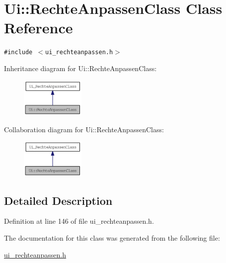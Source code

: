 \hypertarget{class_ui_1_1_rechte_anpassen_class}{
\section{Ui::RechteAnpassenClass Class Reference}
\label{class_ui_1_1_rechte_anpassen_class}
}
{\tt \#include $<$ui\_\-rechteanpassen.h$>$}

Inheritance diagram for Ui::RechteAnpassenClass:\nopagebreak
\begin{figure}[H]
\begin{center}
\leavevmode
\includegraphics[width=87pt]{class_ui_1_1_rechte_anpassen_class__inherit__graph}
\end{center}
\end{figure}
Collaboration diagram for Ui::RechteAnpassenClass:\nopagebreak
\begin{figure}[H]
\begin{center}
\leavevmode
\includegraphics[width=87pt]{class_ui_1_1_rechte_anpassen_class__coll__graph}
\end{center}
\end{figure}


\subsection{Detailed Description}


Definition at line 146 of file ui\_\-rechteanpassen.h.

The documentation for this class was generated from the following file:\begin{CompactItemize}
\item 
\hyperlink{ui__rechteanpassen_8h}{ui\_\-rechteanpassen.h}\end{CompactItemize}
